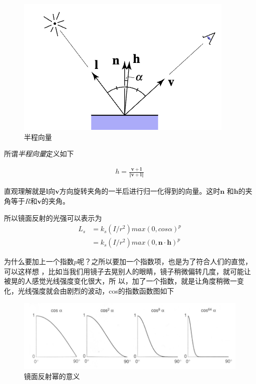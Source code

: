 \begin{figure}[H]
    \centering
    \includegraphics[scale=0.45]{figures/半程向量.png}
    \caption[short]{半程向量}
\end{figure}

所谓\textsl{半程向量}定义如下

\begin{equation}
    \begin{aligned}
        h = \frac{\mathbf{v}+\mathbf{l}}{\Vert\mathbf{v}+\mathbf{l}\Vert}
    \end{aligned}
\end{equation}

直观理解就是$\mathbf{l}$向$\mathbf{v}$方向旋转夹角的一半后进行归一化得到的向量。这时$\mathbf{n}$
和$\mathbf{h}$的夹角等于$R$和$\mathbf{v}$的夹角。

所以镜面反射的光强可以表示为
\begin{equation}
    \begin{aligned}
        L_s &= k_s(I/r^2)max(0,cos\alpha)^p\\
            &= k_s(I/r^2)max(0,\mathbf{n}\cdot \mathbf{h})^p
    \end{aligned}
\end{equation}

为什么要加上一个指数$p$呢？之所以要加一个指数项，也是为了符合人们的直觉，可以这样想
，比如当我们用镜子去晃别人的眼睛，镜子稍微偏转几度，就可能让被晃的人感觉光线强度变化很大，所
以，加了一个指数，就是让角度稍微一变化，光线强度就会由剧烈的波动，cos的指数函数图如下

\begin{figure}[H]
    \centering
    \includegraphics[scale=0.5]{figures/镜面反射幂的意义.png}
    \caption[short]{镜面反射幂的意义}
\end{figure}

